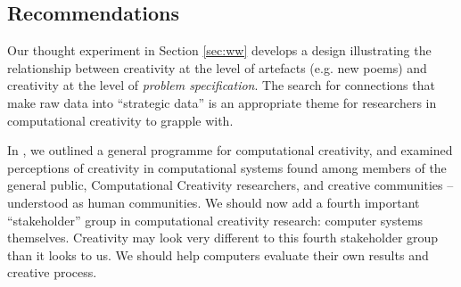 \subsection{Recommendations} \label{sec:recommendations}



Our thought experiment in Section \ref{sec:ww} develops a design
illustrating the relationship between creativity at the level of
artefacts (e.g. new poems) and creativity at the level of
\emph{problem specification}.  The search for connections that make
raw data into ``strategic data'' is an appropriate theme for
researchers in computational creativity to grapple with.


In \cite{stakeholder-groups-bookchapter}, we outlined a general
programme for computational creativity, and examined perceptions of
creativity in computational systems found among members of the general
public, Computational Creativity researchers, and creative communities
-- understood as human communities.  We should now add a fourth
important ``stakeholder'' group in computational creativity research:
computer systems themselves.  Creativity may look very different to
this fourth stakeholder group than it looks to us.  We should help
computers evaluate their own results and creative process.


